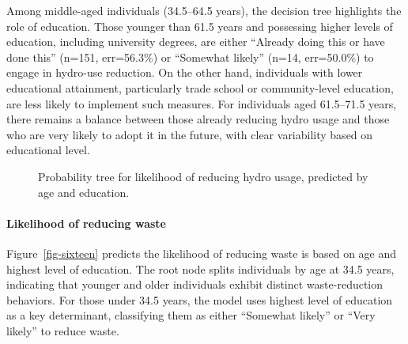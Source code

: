 \documentclass[
  letterpaper,
  DIV=11,
  numbers=noendperiod]{scrartcl}
\let\oldparagraph\paragraph
\renewcommand{\paragraph}[1]{\oldparagraph{#1}\mbox{}}
\begin{document}
Among middle-aged individuals (34.5--64.5 years), the decision tree
highlights the role of education. Those younger than 61.5 years and
possessing higher levels of education, including university degrees, are
either ``Already doing this or have done this'' (n=151, err=56.3\%) or
``Somewhat likely'' (n=14, err=50.0\%) to engage in hydro-use reduction.
On the other hand, individuals with lower educational attainment,
particularly trade school or community-level education, are less likely
to implement such measures. For individuals aged 61.5--71.5 years, there
remains a balance between those already reducing hydro usage and those
who are very likely to adopt it in the future, with clear variability
based on educational level.

\begin{figure}


\caption{\label{fig-fifteen}Probability tree for likelihood of reducing
hydro usage, predicted by age and education.}

\end{figure}%

\paragraph{Likelihood of reducing
waste}\label{likelihood-of-reducing-waste}

Figure~\ref{fig-sixteen} predicts the likelihood of reducing waste is
based on age and highest level of education. The root node splits
individuals by age at 34.5 years, indicating that younger and older
individuals exhibit distinct waste-reduction behaviors. For those under
34.5 years, the model uses highest level of education as a key
determinant, classifying them as either ``Somewhat likely'' or ``Very
likely'' to reduce waste.
\end{document}
